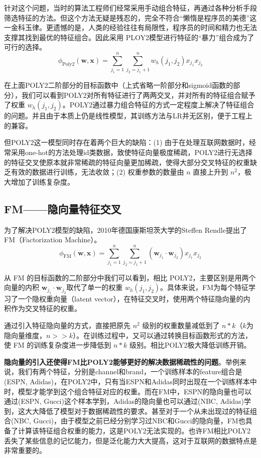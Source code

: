 \documentclass[12pt]{article}
\begin{document}
针对这个问题，当时的算法工程师们经常采用手动组合特征，再通过各种分析手段筛选特征的方法。但这个方法无疑是残忍的，完全不符合“懒惰是程序员的美德”这一金科玉律。更遗憾的是，人类的经验往往有局限性，程序员的时间和精力也无法支撑其找到最优的特征组合。因此采用 PLOY2模型进行特征的“暴力”组合成为了可行的选择。
$$
\phi_{\text{Poly2}}(\mathbf{w}, \mathbf{x}) = \sum_{j_1=1}^n\sum_{j_2 = j_1 + 1}^n w_h(j_1, j_2)x_{j_1}x_{j_2}
$$

在上面POLY2二阶部分的目标函数中（上式省略一阶部分和sigmoid函数的部分），我们可以看到POLY2对所有特征进行了两两交叉，并对所有的特征组合赋予了权重 $w_h(j_1, j_2)$。POLY2通过暴力组合特征的方式一定程度上解决了特征组合的问题。并且由于本质上仍是线性模型，其训练方法与LR并无区别，便于工程上的兼容。

但POLY2这一模型同时存在着两个巨大的缺陷：(1) 由于在处理互联网数据时，经常采用one-hot的方法处理id类数据，致使特征向量极度稀疏，POLY2进行无选择的特征交叉使原本就非常稀疏的特征向量更加稀疏，使得大部分交叉特征的权重缺乏有效的数据进行训练，无法收敛；(2) 权重参数的数量由 $n$ 直接上升到 $n^2$，极大增加了训练复杂度。

\subsection{FM——隐向量特征交叉}
为了解决POLY2模型的缺陷，2010年德国康斯坦茨大学的Steffen Rendle提出了FM（Factorization Machine）。
$$
\phi_{\text{FM}}(\mathbf{w}, \mathbf{x}) = \sum_{j_1=1}^n\sum_{j_2 = j_1 + 1}^n (\mathbf{w}_{j_1} \cdot \mathbf{w}_{j_2})x_{j_1}x_{j_2}
$$

从 FM 的目标函数的二阶部分中我们可以看到，相比 POLY2，主要区别是用两个向量的内积 $\mathbf{w}_{j_1} \cdot \mathbf{w}_{j_2}$取代了单一的权重 $w_h(j_1, j_2)$。具体来说，FM为每个特征学习了一个隐权重向量（latent vector），在特征交叉时，使用两个特征隐向量的内积作为交叉特征的权重。

通过引入特征隐向量的方式，直接把原先 $n^2$ 级别的权重数量减低到了 $n*k$（$k$为隐向量维度，$n >> k$）。在训练过程中，又可以通过转换目标函数形式的方法，使 FM 的训练复杂度进一步降低到 $n*k$ 级别。相比POLY2极大降低训练开销。

\textbf{隐向量的引入还使得FM比POLY2能够更好的解决数据稀疏性的问题}。举例来说，我们有两个特征，分别是channel和brand，一个训练样本的feature组合是(ESPN, Adidas)，在POLY2中，只有当ESPN和Adidas同时出现在一个训练样本中时，模型才能学到这个组合特征对应的权重。而在FM中，ESPN的隐向量也可以通过(ESPN, Gucci)这个样本学到，Adidas的隐向量也可以通过(NBC, Adidas)学到，这大大降低了模型对于数据稀疏性的要求。甚至对于一个从未出现过的特征组合(NBC, Gucci)，由于模型之前已经分别学习过NBC和Gucci的隐向量，FM也具备了计算该特征组合权重的能力，这是POLY2无法实现的。也许FM相比POLY2丢失了某些信息的记忆能力，但是泛化能力大大提高，这对于互联网的数据特点是非常重要的。
\end{document}
